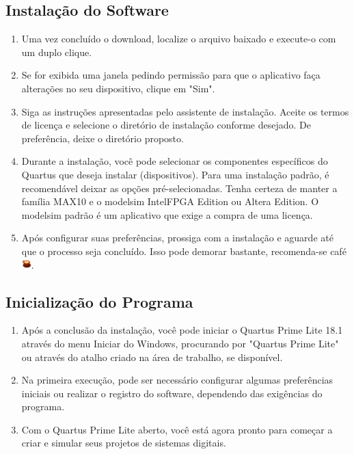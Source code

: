 \documentclass[12pt,a4paper]{article}
\begin{document}
\subsection{Instalação do Software}

\begin{enumerate}
    \item Uma vez concluído o download, localize o arquivo baixado e execute-o com um duplo clique.
    \item Se for exibida uma janela pedindo permissão para que o aplicativo faça alterações no seu dispositivo, clique em "Sim".
    \item Siga as instruções apresentadas pelo assistente de instalação. Aceite os termos de licença e selecione o diretório de instalação conforme desejado. De preferência, deixe o diretório proposto.
    \item Durante a instalação, você pode selecionar os componentes específicos do Quartus que deseja instalar (dispositivos). Para uma instalação padrão, é recomendável deixar as opções pré-selecionadas. Tenha certeza de manter a família MAX10 e o modelsim IntelFPGA Edition ou Altera Edition. O modelsim padrão é um aplicativo que exige a compra de uma licença.
    \item Após configurar suas preferências, prossiga com a instalação e aguarde até que o processo seja concluído. Isso pode demorar bastante, recomenda-se café \includegraphics[height=1em]{latte-art.png}.
\end{enumerate}

\subsection{Inicialização do Programa}

\begin{enumerate}
    \item Após a conclusão da instalação, você pode iniciar o Quartus Prime Lite 18.1 através do menu Iniciar do Windows, procurando por "Quartus Prime Lite" ou através do atalho criado na área de trabalho, se disponível.
    \item Na primeira execução, pode ser necessário configurar algumas preferências iniciais ou realizar o registro do software, dependendo das exigências do programa.
    \item Com o Quartus Prime Lite aberto, você está agora pronto para começar a criar e simular seus projetos de sistemas digitais.
\end{enumerate}
\end{document}
